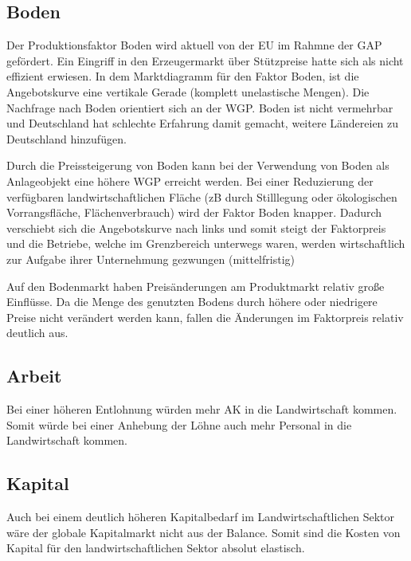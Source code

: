 \documentclass[11pt]{scrartcl}
\begin{document}
\subsection{Boden}
Der Produktionsfaktor Boden wird aktuell von der \ac{EU} im Rahmne der \ac{GAP} gefördert.
Ein Eingriff in den Erzeugermarkt über Stützpreise hatte sich als nicht effizient erwiesen.
In dem Marktdiagramm für den Faktor Boden, ist die Angebotskurve eine vertikale Gerade (komplett unelastische Mengen).
Die Nachfrage nach Boden orientiert sich an der \ac{WGP}.
Boden ist nicht vermehrbar und Deutschland hat schlechte Erfahrung damit gemacht, weitere Ländereien zu Deutschland hinzufügen.

Durch die Preissteigerung von Boden kann bei der Verwendung von Boden als \glqq Anlageobjekt\grqq{} eine höhere \ac{WGP} erreicht werden.
Bei einer Reduzierung der verfügbaren landwirtschaftlichen Fläche (zB durch Stilllegung oder ökologischen Vorrangsfläche, \glqq Flächenverbrauch\grqq{}) wird der Faktor Boden knapper.
Dadurch verschiebt sich die Angebotskurve nach links und somit steigt der Faktorpreis und die Betriebe, welche im Grenzbereich unterwegs waren, werden wirtschaftlich zur Aufgabe ihrer Unternehmung gezwungen (mittelfristig)

Auf den Bodenmarkt haben Preisänderungen am Produktmarkt relativ große Einflüsse.
Da die Menge des genutzten Bodens durch höhere oder niedrigere Preise nicht verändert werden kann, fallen die Änderungen im Faktorpreis relativ deutlich aus.

\subsection{Arbeit}
Bei einer höheren Entlohnung würden mehr \ac{AK} in die Landwirtschaft kommen.
Somit würde bei einer Anhebung der Löhne auch mehr Personal in die Landwirtschaft kommen.


\subsection{Kapital}
Auch bei einem deutlich höheren Kapitalbedarf im Landwirtschaftlichen Sektor wäre der globale Kapitalmarkt nicht aus der Balance.
Somit sind die Kosten von Kapital für den landwirtschaftlichen Sektor absolut elastisch.




\end{document}
